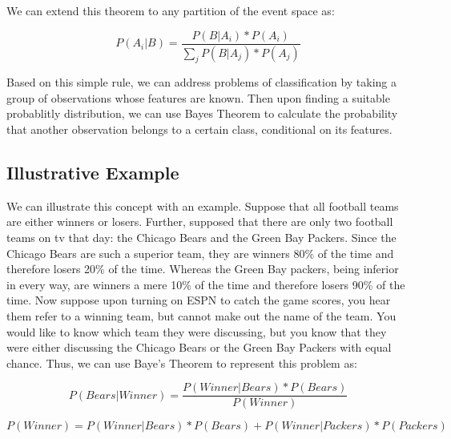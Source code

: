 \begin{flushleft}We can extend this theorem to any partition of the event space as:
\end{flushleft}

\begin{equation}
P(A_{i}|B)=\frac{P(B|A_{i})*P(A_{i})}{\sum_{j}P(B|A_{j})*P(A_{j})}
\end{equation}

\begin{flushleft}Based on this simple rule, we can address problems of classification by taking a group of observations whose features are known. Then upon finding a suitable probablitly distribution, we can use Bayes Theorem to calculate the probability that another observation belongs to a certain class, conditional on its features. 
\end{flushleft}


\subsection{Illustrative Example} %

\begin{flushleft}We can illustrate this concept with an example. Suppose that all football teams are either winners or losers. Further, supposed that there are only two football teams on tv that day: the Chicago Bears and the Green Bay Packers. Since the Chicago Bears are such a superior team, they are winners 80\% of the time and therefore losers 20\% of the time. Whereas the Green Bay packers, being inferior in every way, are winners a mere 10\% of the time and therefore losers 90\% of the time. Now suppose upon turning on ESPN to catch the game scores, you hear them refer to a winning team, but cannot make out the name of the team. You would like to know which team they were discussing, but you know that they were either discussing the Chicago Bears or the Green Bay Packers with equal chance. Thus, we can use Baye's Theorem to represent this problem as:
\end{flushleft}

\begin{equation}
P(Bears|Winner)=\frac{P(Winner|Bears)*P(Bears)}{P(Winner)}
\end{equation}

\begin{equation}
P(Winner)=P(Winner|Bears)*P(Bears)+P(Winner|Packers)*P(Packers)
\end{equation}

